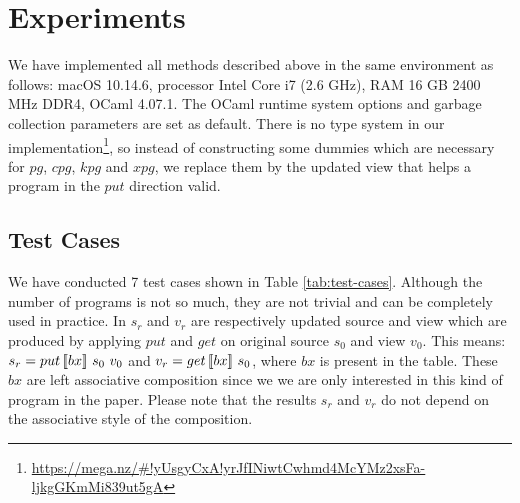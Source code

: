 \section{Experiments}

We have implemented all methods described above in the same environment as follows: macOS 10.14.6, processor Intel Core i7 (2.6 GHz), RAM 16 GB 2400 MHz DDR4, OCaml 4.07.1. The OCaml runtime system options and garbage collection parameters are set as default. There is no type system in our implementation\footnote{\url{https://mega.nz/\#!yUsgyCxA!yrJfINiwtCwhmd4McYMz2xsFa-ljkgGKmMi839ut5gA}}, so instead of constructing some dummies which are necessary for $pg$, $cpg$, $kpg$ and $xpg$, we replace them by the updated view that helps a program in the $put$ direction valid.

\subsection{Test Cases}

We have conducted 7 test cases shown in Table \ref{tab:test-cases}. Although the number of programs is not so much, they are not trivial and can be completely used in practice. In $s_r$ and $v_r$ are respectively updated source and view which are produced by applying $put$ and $get$ on original source $s_0$ and view $v_0$. This means: $s_r = put \, [\![bx]\!] \ s_0 \ v_0$ and $v_r = get \, [\![bx]\!] \ s_0$, where $bx$ is present in the table. These $bx$ are left associative composition since we we are only interested in this kind of program in the paper. Please note that the results $s_r$ and $v_r$ do not depend on the associative style of the composition.

